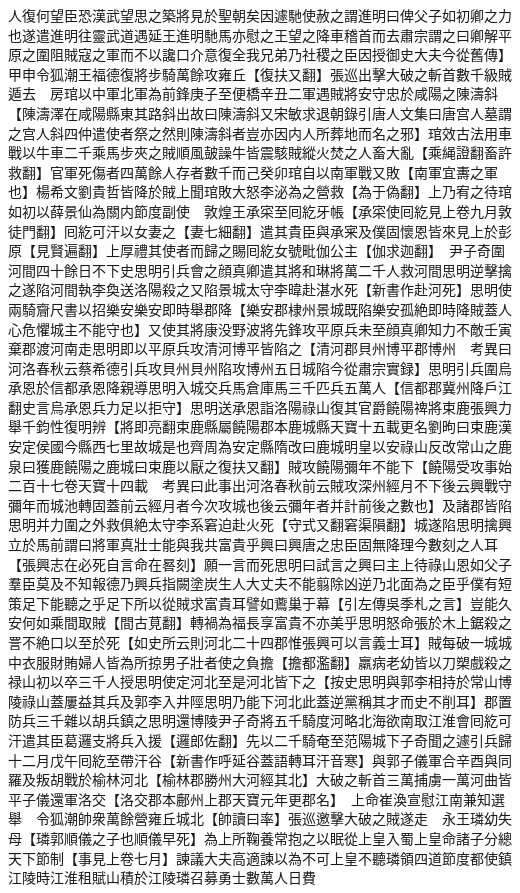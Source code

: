 人復何望臣恐漢武望思之築將見於聖朝矣因遽馳使赦之謂進明曰俾父子如初卿之力也遂遣進明往靈武道遇延王進明馳馬亦慰之王望之降車稽首而去肅宗謂之曰卿解平原之圍阻賊寇之軍而不以讒口介意復全我兄弟乃社稷之臣因授御史大夫今從舊傳】　甲申令狐潮王福德復將步騎萬餘攻雍丘【復扶又翻】張巡出擊大破之斬首數千級賊遁去　房琯以中軍北軍為前鋒庚子至便橋辛丑二軍遇賊將安守忠於咸陽之陳濤斜【陳濤澤在咸陽縣東其路斜出故曰陳濤斜又宋敏求退朝錄引唐人文集曰唐宫人墓謂之宫人斜四仲遣使者祭之然則陳濤斜者豈亦因内人所葬地而名之邪】琯效古法用車戰以牛車二千乘馬步夾之賊順風皷譟牛皆震駭賊縱火焚之人畜大亂【乘䋲證翻畜許救翻】官軍死傷者四萬餘人存者數千而己癸卯琯自以南軍戰又敗【南軍宜夀之軍也】楊希文劉貴哲皆降於賊上聞琯敗大怒李泌為之營救【為于偽翻】上乃宥之待琯如初以薛景仙為關内節度副使　敦煌王承寀至囘紇牙帳【承寀使囘紇見上卷九月敦徒門翻】囘紇可汗以女妻之【妻七細翻】遣其貴臣與承宷及僕固懷恩皆來見上於彭原【見賢遍翻】上厚禮其使者而歸之賜囘紇女號毗伽公主【伽求迦翻】　尹子奇圍河間四十餘日不下史思明引兵會之顔真卿遣其將和琳將萬二千人救河間思明逆擊擒之遂陷河間執李奐送洛陽殺之又陷景城太守李暐赴湛水死【新書作赴河死】思明使兩騎齎尺書以招樂安樂安即時舉郡降【樂安郡棣州景城既陷樂安孤絶即時降賊蓋人心危懼城主不能守也】又使其將康没野波將先鋒攻平原兵未至顔真卿知力不敵壬寅棄郡渡河南走思明即以平原兵攻清河博平皆陷之【清河郡貝州博平郡博州　考異曰河洛春秋云蔡希德引兵攻貝州貝州陷攻博州五日城陷今從肅宗實録】思明引兵圍烏承恩於信都承恩降親導思明入城交兵馬倉庫馬三千匹兵五萬人【信都郡冀州降戶江翻史言烏承恩兵力足以拒守】思明送承恩詣洛陽祿山復其官爵饒陽禆將束鹿張興力舉千鈞性復明辨【將即亮翻束鹿縣屬饒陽郡本鹿城縣天寶十五載更名劉昫曰束鹿漢安定侯國今縣西七里故城是也齊周為安定縣隋改曰鹿城明皇以安祿山反改常山之鹿泉曰獲鹿饒陽之鹿城曰束鹿以厭之復扶又翻】賊攻饒陽彌年不能下【饒陽受攻事始二百十七卷天寶十四載　考異曰此事出河洛春秋前云賊攻深州經月不下後云興戰守彌年而城池轉固蓋前云經月者今次攻城也後云彌年者并計前後之數也】及諸郡皆陷思明并力圍之外救俱絶太守李系窘迫赴火死【守式又翻窘渠隕翻】城遂陷思明擒興立於馬前謂曰將軍真壯士能與我共富貴乎興曰興唐之忠臣固無降理今數刻之人耳【張興志在必死自言命在晷刻】願一言而死思明曰試言之興曰主上待祿山恩如父子羣臣莫及不知報德乃興兵指闕塗炭生人大丈夫不能翦除凶逆乃北面為之臣乎僕有短策足下能聽之乎足下所以從賊求富貴耳譬如鷰巢于幕【引左傳吳季札之言】豈能久安何如乘間取賊【間古莧翻】轉禍為福長享富貴不亦美乎思明怒命張於木上鋸殺之詈不絶口以至於死【如史所云則河北二十四郡惟張興可以言義士耳】賊每破一城城中衣服財賄婦人皆為所掠男子壯者使之負擔【擔都濫翻】羸病老幼皆以刀槊戲殺之禄山初以卒三千人授思明使定河北至是河北皆下之【按史思明與郭李相持於常山博陵祿山蓋屢益其兵及郭李入井陘思明乃能下河北此蓋逆黨稱其才而史不削耳】郡置防兵三千雜以胡兵鎮之思明還博陵尹子奇將五千騎度河略北海欲南取江淮會囘紇可汗遣其臣葛邏支將兵入援【邏郎佐翻】先以二千騎奄至范陽城下子奇聞之遽引兵歸　十二月戊午囘紇至帶汗谷【新書作呼延谷蓋語轉耳汗音寒】與郭子儀軍合辛酉與同羅及叛胡戰於榆林河北【榆林郡勝州大河經其北】大破之斬首三萬捕虜一萬河曲皆平子儀還軍洛交【洛交郡本鄜州上郡天寶元年更郡名】　上命崔渙宣慰江南兼知選舉　令狐潮帥衆萬餘營雍丘城北【帥讀曰率】張巡邀擊大破之賊遂走　永王璘幼失母【璘郭順儀之子也順儀早死】為上所鞠養常抱之以眠從上皇入蜀上皇命諸子分總天下節制【事見上卷七月】諫議大夫高適諫以為不可上皇不聽璘領四道節度都使鎮江陵時江淮租賦山積於江陵璘召募勇士數萬人日費
